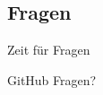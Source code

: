 \subsection{Fragen}
\begin{frame}{Zeit für Fragen}
	\begin{center}
		GitHub
		\Huge Fragen?
	\end{center}
\end{frame}

